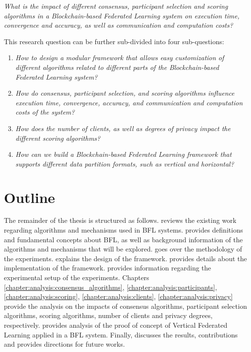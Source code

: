 \begin{center}
    \textit{What is the impact of different consensus, participant selection and scoring algorithms in a Blockchain-based Federated Learning system on execution time, convergence and accuracy, as well as communication and computation costs?}
\end{center}

This research question can be further sub-divided into four sub-questions:

\begin{enumerate}
    \item \textit{How to design a modular framework that allows easy customization of different algorithms related to different parts of the Blockchain-based Federated Learning system?}
    
    \item \textit{How do consensus, participant selection, and scoring algorithms influence execution time, convergence, accuracy, and communication and computation costs of the system?}
    
    \item \textit{How does the number of clients, as well as degrees of privacy impact the different scoring algorithms?}
    
    \item \textit{How can we build a Blockchain-based Federated Learning framework that supports different data partition formats, such as vertical and horizontal?}
\end{enumerate}

\section{Outline}\label{intro:outline}

The remainder of the thesis is structured as follows.  reviews the existing work regarding algorithms and mechanisms used in BFL systems.  provides definitions and fundamental concepts about BFL, as well as background information of the algorithms and mechanisms that will be explored.  goes over the methodology of the experiments.  explains the design of the framework.  provides details about the implementation of the framework.  provides information regarding the experimental setup of the experiments. Chapters \ref{chapter:analysis:consensus_algorithms}, \ref{chapter:analysis:participants}, \ref{chapter:analysis:scoring}, \ref{chapter:analysis:clients}, \ref{chapter:analysis:privacy} provide the analysis on the impacts of consensus algorithms, participant selection algorithms, scoring algorithms, number of clients and privacy degrees, respectively.  provides analysis of the proof of concept of Vertical Federated Learning applied in a BFL system. Finally,  discusses the results, contributions and provides directions for future works.

